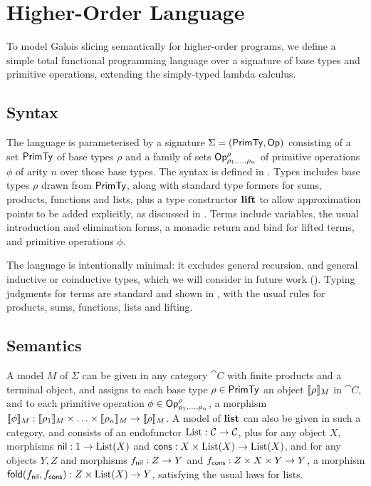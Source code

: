 \section{Higher-Order Language}
\label{sec:language}

To model Galois slicing semantically for higher-order programs, we define a simple total functional
programming language over a signature of base types and primitive operations, extending the simply-typed
lambda calculus.

\subsection{Syntax}
\label{sec:language:syntax}

The language is parameterised by a signature $\Sigma = (\mathsf{PrimTy}, \mathsf{Op})$ consisting of a set $\mathsf{PrimTy}$ of
base types $\rho$ and a family of sets $\mathsf{Op}^\rho_{\rho_1,\ldots,\rho_n}$ of primitive operations $\phi$ of
arity $n$ over those base types. The syntax is defined in . Types includes base types $\rho$
drawn from $\mathsf{PrimTy}$, along with standard type formers for sums, products, functions and lists, plus a type
constructor $\mathbf{lift}$ to allow approximation points to be added explicitly, as discussed in
. Terms include variables, the usual introduction and elimination forms, a monadic
return and bind for lifted terms, and primitive operations $\phi$.

The language is intentionally minimal: it excludes general recursion, and general inductive or coinductive
types, which we will consider in future work (). Typing judgments for terms are standard
and shown in , with the usual rules for products, sums, functions, lists and lifting.




\subsection{Semantics}
\label{sec:language:semantics}



A model $M$ of $\Sigma$ can be given in any category $\cat{C}$ with finite products and a terminal object, and
assigns to each base type $\rho \in \mathsf{PrimTy}$ an object $\llbracket \rho \rrbracket_{M}$ in $\cat{C}$, and to each primitive
operation $\phi \in \mathsf{Op}^\rho_{\rho_1,\ldots,\rho_n}$, a morphism $\llbracket \phi \rrbracket_{M}: \llbracket \rho_1 \rrbracket_{M} \times
\ldots \times \llbracket \rho_n \rrbracket_{M} \to \llbracket \rho \rrbracket_{M}$. A model of $\mathbf{list}$ can also be given in such a category,
and consists of an endofunctor $\mathrm{List}: \mathcal{C} \to \mathcal{C}$, plus for any object $X$, morphisms $\mathsf{nil}: 1 \to
\mathrm{List}(X)$ and $\mathsf{cons}: X \times \mathrm{List}(X) \to \mathrm{List}(X)$, and for any objects $Y, Z$ and morphisms $f_{\mathsf{nil}}: Z \to
Y$ and $f_{\mathsf{cons}}: Z \times X \times Y \to Y$, a morphism $\mathsf{fold}(f_{\mathsf{nil}},f_{\mathsf{cons}}): Z \times \mathrm{List}(X) \to Y$,
satisfying the usual laws for lists.

